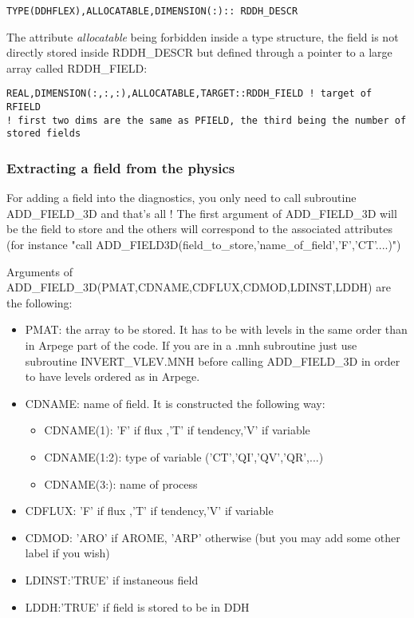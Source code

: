 \begin{verbatim}
TYPE(DDHFLEX),ALLOCATABLE,DIMENSION(:):: RDDH_DESCR
\end{verbatim}

The attribute {\em allocatable} being forbidden inside a type structure, the field is not directly stored inside RDDH\_DESCR but defined through a pointer
to a large array called RDDH\_FIELD:


\begin{verbatim}
REAL,DIMENSION(:,:,:),ALLOCATABLE,TARGET::RDDH_FIELD ! target of RFIELD 
! first two dims are the same as PFIELD, the third being the number of stored fields
\end{verbatim}



\subsubsection*{Extracting a field from the physics }
For adding a field into the diagnostics, you only need to call subroutine ADD\_FIELD\_3D and that's all ! 
The first argument of ADD\_FIELD\_3D will be the field to store and the others will correspond to the associated attributes (for instance "call ADD\_FIELD\-3D(field\_to\_store,'name\_of\_field','F','CT'....)")

Arguments of ADD\_FIELD\_3D(PMAT,CDNAME,CDFLUX,CDMOD,LDINST,LDDH) are the following:

\begin{itemize}
 \item PMAT: the array to be stored. It has to be with levels in the same order than in Arpege part of the code.
If you are in a .mnh subroutine  just use subroutine INVERT\_VLEV.MNH before calling  ADD\_FIELD\_3D
in order to have levels ordered as in Arpege.
\item  CDNAME: name of field. It is constructed the following way:
\begin{itemize}
\item CDNAME(1): 'F' if flux ,'T' if tendency,'V' if variable
\item CDNAME(1:2): type of variable ('CT','QI','QV','QR',...)
 \item CDNAME(3:): name of process
\end{itemize}
\item CDFLUX: 'F' if flux ,'T' if tendency,'V' if variable
\item CDMOD: 'ARO' if AROME, 'ARP' otherwise (but you may add some other label if you wish)
\item LDINST:'TRUE' if instaneous field 
\item LDDH:'TRUE' if field is stored to be in DDH
\end{itemize}



